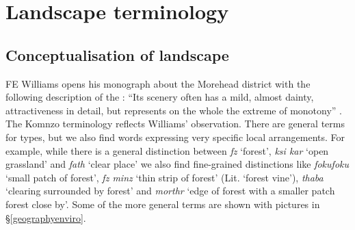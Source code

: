 \section{Landscape terminology}\label{landscapeterminology}

\subsection{Conceptualisation of landscape}\label{cncptlndscp}

FE Williams opens his monograph about the Morehead district with the following description of the : ``Its scenery often has a mild, almost dainty, attractiveness in detail, but represents on the whole the extreme of monotony'' \citep[1]{Williams:1936transfly}. The Komnzo terminology reflects Williams' observation. There are general terms for  types, but we also find words expressing very specific local arrangements. For example, while there is a general distinction between \emph{fz} `forest', \emph{ksi kar} `open grassland' and \emph{fath} `clear place' we also find fine-grained distinctions like \emph{fokufoku} `small patch of forest', \emph{fz minz} `thin strip of forest' (Lit. `forest vine'), \emph{thaba} `clearing surrounded by forest' and \emph{morthr} `edge of forest with a smaller patch forest close by'. Some of the more general terms are shown with pictures in \S{}\ref{geographyenviro}.%

